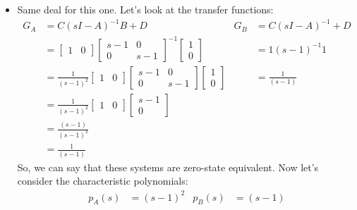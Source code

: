 \documentclass[10pt]{article}
\begin{document}
\begin{itemize}
\item[]
Same deal for this one.  Let's look at the transfer functions:
\begin{align*}
  G_A &=C(sI-A)^{-1}B + D & G_B &= C(sI - A)^{-1} + D\\
  &=
  \begin{bmatrix}
    1 &0 
  \end{bmatrix}
  \begin{bmatrix}
    s-1 & 0 \\ 0 & s-1
  \end{bmatrix}^{-1}
  \begin{bmatrix}
    1\\0
  \end{bmatrix}
  &&=
    1 (s-1)^{-1}1\\
  &= \frac{1}{(s-1)^2}
  \begin{bmatrix}
    1 &0 
  \end{bmatrix}
  \begin{bmatrix}
    s-1 & 0 \\ 0 & s-1
  \end{bmatrix}
  \begin{bmatrix}
    1\\0
  \end{bmatrix}
  &&=\frac{1}{(s-1)}\\
  &= \frac{1}{(s-1)^2}
  \begin{bmatrix}
    1 &0 
  \end{bmatrix}
  \begin{bmatrix}
    s-1  \\ 0 
  \end{bmatrix}
  &&\\
  &=\frac{(s-1)}{(s-1)^2} 
  &&\\
  &=\frac{1}{(s-1)}
  &&
\end{align*}
So, we can say that these systems are zero-state equivalent.  Now
let's consider the characteristic polynomials:
\begin{align*}
  p_A(s) &=(s-1)^2 & p_B(s) &= (s-1)
\end{align*}
\end{itemize}
\end{document}

